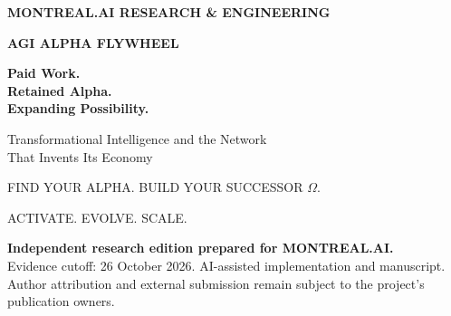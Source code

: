 \documentclass[11pt,letterpaper]{article}
\begin{document}
\hypersetup{pageanchor=false}
\begin{titlepage}
\color{ink}
{\small\bfseries MONTREAL.AI \hfill RESEARCH \& ENGINEERING}\par
\vspace{0.9cm}
{\Large\bfseries AGI ALPHA FLYWHEEL}\par
\vspace{0.5cm}
{\fontsize{33}{39}\selectfont\bfseries Paid Work.\\Retained Alpha.\\Expanding Possibility.\par}
\vspace{0.45cm}
{\Large Transformational Intelligence and the Network\\That Invents Its Economy\par}
\vspace{0.35cm}
{\large FIND YOUR ALPHA. BUILD YOUR SUCCESSOR $\Omega$.}\par
{\small ACTIVATE. EVOLVE. SCALE.}\par
\vspace{0.45cm}
\color{black}
\textbf{Independent research edition prepared for MONTREAL.AI.}\\
Evidence cutoff: 26 October 2026. AI-assisted implementation and manuscript.\\
Author attribution and external submission remain subject to the project's publication owners.
\vspace{0.35cm}
\begin{abstract}
Can demanding paid work leave reusable capabilities whose remaining costs are
small enough to create additional productive value? We study an automated
coordination-mechanism foundry, separating competent frontier-model assistance
(Beta) from scoped net mission advantage due to retained capabilities (Alpha).
An executable simulator maintains three cost books: complete customer-job delivery,
additional retention and reuse, and optional separate research. Historical job
development is never charged a second time to prospective retention. A tested
graph requires a current Alpha assessment before admission and makes eligible
capabilities available to every authenticated network member while keeping action
permissions separate. An exact local mechanism-design witness matches an
exhaustive oracle in 48 fresh small cases and verifies five larger certificates;
its transfer result is mixed, with fewer construction transitions and more
certificate inequalities checked across the creator and recipients. The economic
protocol evaluates 32 policy candidates and 64 fresh confirmation worlds per

\end{abstract}
\end{titlepage}
\end{document}
